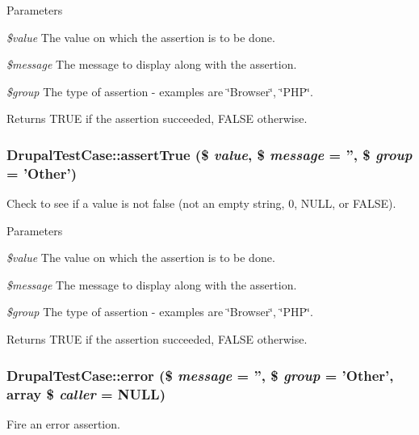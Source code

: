 \begin{DoxyParams}{Parameters}
\item[{\em \$value}]The value on which the assertion is to be done. \item[{\em \$message}]The message to display along with the assertion. \item[{\em \$group}]The type of assertion -\/ examples are \char`\"{}Browser\char`\"{}, \char`\"{}PHP\char`\"{}. \end{DoxyParams}
\begin{DoxyReturn}{Returns}
TRUE if the assertion succeeded, FALSE otherwise. 
\end{DoxyReturn}
\hypertarget{class_drupal_test_case_a05171bcd0d7a73b1164502e6477423ff}{
\subsubsection[{assertTrue}]{\setlength{\rightskip}{0pt plus 5cm}DrupalTestCase::assertTrue (\$ {\em value}, \/  \$ {\em message} = {\ttfamily ''}, \/  \$ {\em group} = {\ttfamily 'Other'})}}
\label{class_drupal_test_case_a05171bcd0d7a73b1164502e6477423ff}
Check to see if a value is not false (not an empty string, 0, NULL, or FALSE).


\begin{DoxyParams}{Parameters}
\item[{\em \$value}]The value on which the assertion is to be done. \item[{\em \$message}]The message to display along with the assertion. \item[{\em \$group}]The type of assertion -\/ examples are \char`\"{}Browser\char`\"{}, \char`\"{}PHP\char`\"{}. \end{DoxyParams}
\begin{DoxyReturn}{Returns}
TRUE if the assertion succeeded, FALSE otherwise. 
\end{DoxyReturn}
\hypertarget{class_drupal_test_case_a4155c3ed4cbf233c259301427dee59fb}{
\subsubsection[{error}]{\setlength{\rightskip}{0pt plus 5cm}DrupalTestCase::error (\$ {\em message} = {\ttfamily ''}, \/  \$ {\em group} = {\ttfamily 'Other'}, \/  array \$ {\em caller} = {\ttfamily NULL})}}
\label{class_drupal_test_case_a4155c3ed4cbf233c259301427dee59fb}
Fire an error assertion.


